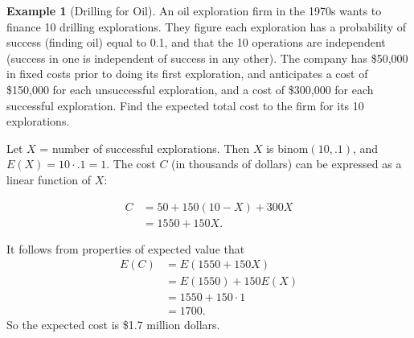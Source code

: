 \documentclass[
]{book}
\theoremstyle{definition}
\theoremstyle{definition}
\newtheorem{example}{Example}[chapter]
\theoremstyle{definition}
\theoremstyle{definition}
\theoremstyle{remark}
\begin{document}
\begin{example}[Drilling for Oil]
\protect\hypertarget{exm:binomial-oil}{}\label{exm:binomial-oil}An oil exploration firm in the 1970s wants to finance 10 drilling explorations. They figure each exploration has a probability of success (finding oil) equal to 0.1, and that the 10 operations are independent (success in one is independent of success in any other). The company has \$50,000 in fixed costs prior to doing its first exploration, and anticipates a cost of \$150,000 for each unsuccessful exploration, and a cost of \$300,000 for each successful exploration. Find the expected total cost to the firm for its 10 explorations.

Let \(X\) = number of successful explorations. Then \(X\) is binom\((10,.1)\), and \(E(X) = 10 \cdot .1 = 1.\)
The cost \(C\) (in thousands of dollars) can be expressed as a linear function of \(X\):

\begin{align*}
C &= 50 + 150(10-X)+300X\\
  &= 1550 + 150X.
\end{align*}

It follows from properties of expected value that
\begin{align*}
E(C) &= E(1550 + 150X)\\
     &= E(1550) + 150E(X)\\
     &= 1550 + 150 \cdot 1 \\
     &= 1700.
\end{align*}
So the expected cost is \$1.7 million dollars.
\end{example}
\end{document}
